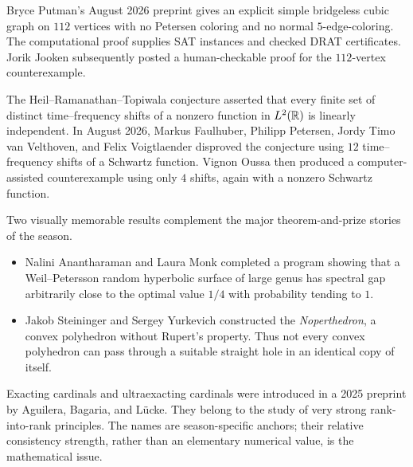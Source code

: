     \begin{fact}
        Bryce Putman's August 2026 preprint gives an explicit simple bridgeless
        cubic graph on $112$ vertices with no Petersen coloring and no normal
        $5$-edge-coloring. The computational proof supplies SAT instances and
        checked DRAT certificates. Jorik Jooken subsequently posted a
        human-checkable proof for the $112$-vertex counterexample.
    \end{fact}

    \begin{fact}
        The Heil--Ramanathan--Topiwala conjecture asserted that every finite set
        of distinct time--frequency shifts of a nonzero function in
        $L^2(\mathbb{R})$ is linearly independent. In August 2026, Markus Faulhuber,
        Philipp Petersen, Jordy Timo van Velthoven, and Felix Voigtlaender
        disproved the conjecture using $12$ time--frequency shifts of a
        Schwartz function. Vignon Oussa then produced a computer-assisted
        counterexample using only $4$ shifts, again with a nonzero Schwartz
        function.
    \end{fact}

    \begin{fact}
        Two visually memorable results complement the major theorem-and-prize
        stories of the season.
        \begin{itemize}
            \item Nalini Anantharaman and Laura Monk completed a program showing
                  that a Weil--Petersson random hyperbolic surface of large genus
                  has spectral gap arbitrarily close to the optimal value
                  $1/4$ with probability tending to $1$.
            \item Jakob Steininger and Sergey Yurkevich constructed the
                  \emph{Noperthedron}, a convex polyhedron without Rupert's
                  property. Thus not every convex polyhedron can pass through a
                  suitable straight hole in an identical copy of itself.
        \end{itemize}
    \end{fact}

    \begin{fact}
        Exacting cardinals and ultraexacting cardinals were introduced in a 2025
        preprint by Aguilera, Bagaria, and L\"ucke. They belong to the study of
        very strong rank-into-rank principles. The names are season-specific
        anchors; their relative consistency strength, rather than an elementary
        numerical value, is the mathematical issue.
    \end{fact}

